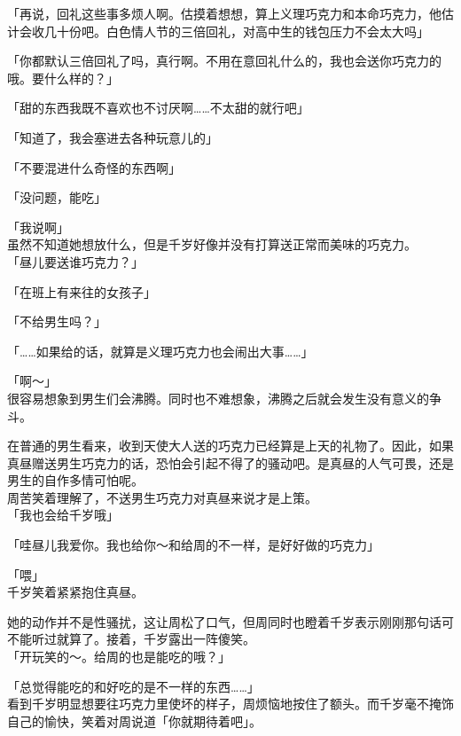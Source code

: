 「再说，回礼这些事多烦人啊。估摸着想想，算上义理巧克力和本命巧克力，他估计会收几十份吧。白色情人节的三倍回礼，对高中生的钱包压力不会太大吗」

「你都默认三倍回礼了吗，真行啊。不用在意回礼什么的，我也会送你巧克力的哦。要什么样的？」

「甜的东西我既不喜欢也不讨厌啊……不太甜的就行吧」

「知道了，我会塞进去各种玩意儿的」

「不要混进什么奇怪的东西啊」

「没问题，能吃」

「我说啊」\\

虽然不知道她想放什么，但是千岁好像并没有打算送正常而美味的巧克力。\\

「昼儿要送谁巧克力？」

「在班上有来往的女孩子」

「不给男生吗？」

「……如果给的话，就算是义理巧克力也会闹出大事……」

「啊～」\\

很容易想象到男生们会沸腾。同时也不难想象，沸腾之后就会发生没有意义的争斗。

在普通的男生看来，收到天使大人送的巧克力已经算是上天的礼物了。因此，如果真昼赠送男生巧克力的话，恐怕会引起不得了的骚动吧。是真昼的人气可畏，还是男生的自作多情可怕呢。\\

周苦笑着理解了，不送男生巧克力对真昼来说才是上策。\\

「我也会给千岁哦」

「哇昼儿我爱你。我也给你～和给周的不一样，是好好做的巧克力」

「喂」\\

千岁笑着紧紧抱住真昼。

她的动作并不是性骚扰，这让周松了口气，但周同时也瞪着千岁表示刚刚那句话可不能听过就算了。接着，千岁露出一阵傻笑。\\

「开玩笑的～。给周的也是能吃的哦？」

「总觉得能吃的和好吃的是不一样的东西……」\\

看到千岁明显想要往巧克力里使坏的样子，周烦恼地按住了额头。而千岁毫不掩饰自己的愉快，笑着对周说道「你就期待着吧」。
